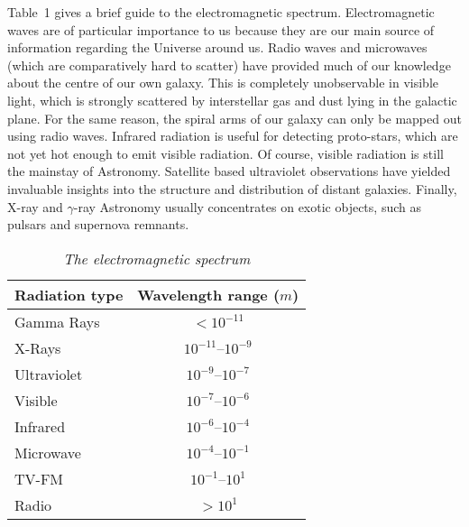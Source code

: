 Table~1 gives a brief guide to the electromagnetic spectrum. 
Electromagnetic waves are of particular importance to us because they 
are our main source of information regarding the Universe around us. 
Radio waves and microwaves (which are comparatively
hard to scatter) have provided much of
our knowledge about the centre of our own galaxy. This is completely unobservable
in visible light, which is strongly scattered by interstellar gas and dust
lying in the galactic plane. 
For the same reason, the spiral arms of our galaxy can only be mapped out using radio waves.
Infrared radiation is useful for detecting 
proto-stars, which are not yet hot enough to emit visible radiation.
Of course, visible radiation is still the mainstay of Astronomy. 
Satellite based ultraviolet observations have yielded invaluable insights into
the structure and distribution of distant galaxies. Finally, X-ray and $\gamma$-ray
Astronomy usually concentrates on  exotic objects, such as pulsars
and supernova remnants. 
\begin{table}
\centering
\begin{tabular}{lc}\hline
{\bf Radiation type}& {\bf Wavelength range} ($m$)\\[0.5ex]\hline
Gamma Rays & $<10^{-11}$ \\[0.5ex]
X-Rays & $10^{-11}$--$10^{-9}$ \\[0.5ex]
Ultraviolet & $10^{-9}$--$10^{-7}$\\[0.5ex]
Visible & $10^{-7}$--$10^{-6}$\\[0.5ex]
Infrared& $10^{-6}$--$10^{-4}$\\[0.5ex]
Microwave & $10^{-4}$--$10^{-1}$\\[0.5ex]
TV-FM & $10^{-1}$--$10^1$ \\[0.5ex]
Radio& $>10^1$
\end{tabular}
\caption{\em The electromagnetic spectrum}
\end{table}

